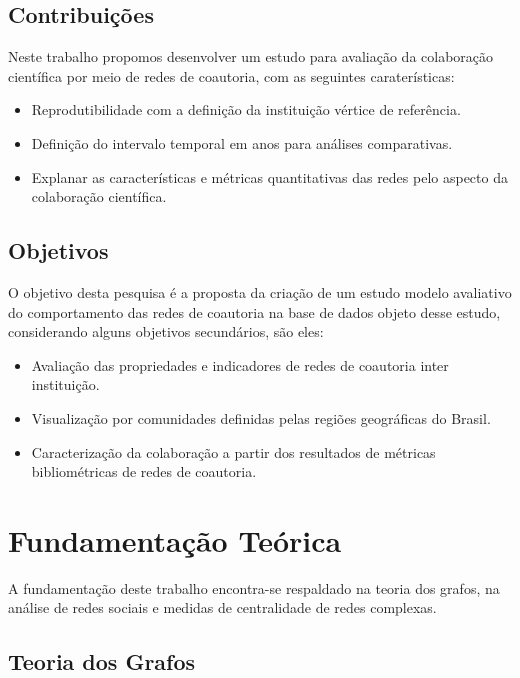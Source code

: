 \documentclass[12pt]{article}
\begin{document}
\subsection{\textbf{Contribuições}}
  
Neste trabalho propomos desenvolver um estudo para avaliação da colaboração científica por meio de redes de coautoria, com as seguintes caraterísticas:

\begin{itemize}
\item Reprodutibilidade com a definição da instituição vértice de referência.
\item Definição do intervalo temporal em anos para análises comparativas.
\item Explanar as características e métricas quantitativas das redes pelo aspecto da colaboração científica.
\end{itemize}

\subsection{\textbf{Objetivos}}

O objetivo desta pesquisa é a proposta da criação de um estudo modelo avaliativo do comportamento das redes de coautoria na base de dados objeto desse estudo, considerando alguns objetivos secundários, são eles:

\begin{itemize}
\item Avaliação das propriedades e indicadores de redes de coautoria inter instituição.
\item Visualização por comunidades definidas pelas regiões geográficas do Brasil.
\item Caracterização da colaboração a partir dos resultados de métricas bibliométricas de redes de coautoria.
\end{itemize}

\section{Fundamentação Teórica}

A fundamentação deste trabalho encontra-se respaldado na teoria dos grafos, na análise de redes sociais e medidas de centralidade de redes complexas. 


\subsection{Teoria dos Grafos}
\end{document}
